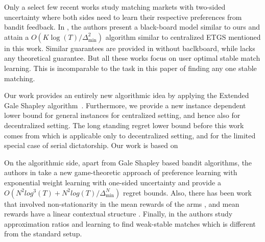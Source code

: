 \documentclass{article}
\begin{document}
Only a select few recent works \cite{pokharel2023converging, tejas_2024, zhangdecentralized} study matching markets with two-sided uncertainty where both sides need to learn their respective preferences from bandit feedback. In \cite{tejas_2024}, the authors present a black-board model similar to ours and attain a $O(K\log(T)/ \Delta_{\min}^2)$ algorithm similar to centralized ETGS mentioned in this work. Similar guarantees are provided in \cite{zhangdecentralized} without baclkboard, while \cite{pokharel2023converging} lacks any theoretical guarantee. But all these works focus on user optimal stable match learning. This is incomparable to the task in this paper of finding any one stable matching. 

Our work provides an entirely new algorithmic idea by applying the Extended Gale Shapley algorithm~\cite{irving1994stable}. Furthermore, we provide a new instance dependent lower bound for general instances for centralized setting, and hence also for decentralized setting. The long standing regret lower bound before this work comes from \cite{basu_2021} which is applicable only to decentralized setting, and for the limited special case of serial dictatorship. Our work is based on  

On the algorithmic side, apart from Gale Shapley based bandit algorithms, the authors in \cite{srikanth_uiuc} take a new game-theoretic approach of preference learning with exponential weight learning with one-sided uncertainty and provide a $O(N^2log^3(T) +  N^2log(T)/ \Delta_{\min}^N)$ regret bounds. Also, there has been work that involved non-stationarity in the mean rewards of the arms \cite{avishek_nonstationary, maheshwari_2022}, and mean rewards have a linear contextual structure \cite{jagadeesan2021learning, parikh2024competing}. Finally, in \cite{lin2024stable} the authors study approximation ratios and learning to find weak-stable matches which is different from the standard setup. 


\end{document}

